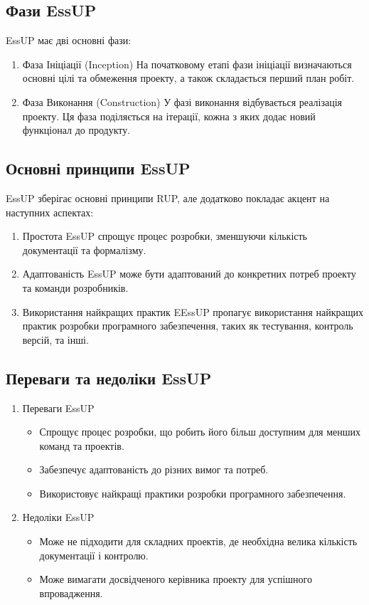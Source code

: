 \documentclass[letterpaper]{report}
\begin{document}
		\subsection{Фази EssUP}

			EssUP має дві основні фази:

			\begin{enumerate}
				\item  Фаза Ініціації (Inception)
					На початковому етапі фази ініціації визначаються основні цілі та обмеження проекту, а також складається перший план робіт.
				\item Фаза Виконання (Construction)
					У фазі виконання відбувається реалізація проекту. Ця фаза поділяється на ітерації, кожна з яких додає новий функціонал до продукту.
			\end{enumerate}

		\subsection{Основні принципи EssUP}

			EssUP зберігає основні принципи RUP, але додатково покладає акцент на наступних аспектах:

			\begin{enumerate}
				\item Простота
					EssUP спрощує процес розробки, зменшуючи кількість документації та формалізму.
				\item Адаптованість
					EssUP може бути адаптований до конкретних потреб проекту та команди розробників.
				\item Використання найкращих практик
					EEssUP пропагує використання найкращих практик розробки програмного забезпечення, таких як тестування, контроль версій, та інші.
			\end{enumerate}

		\subsection{Переваги та недоліки EssUP}

			\begin{enumerate}
				\item Переваги EssUP
					\begin{itemize}
						\item Спрощує процес розробки, що робить його більш доступним для менших команд та проектів.
						\item Забезпечує адаптованість до різних вимог та потреб.
						\item Використовує найкращі практики розробки програмного забезпечення.
					\end{itemize}
				\item Недоліки EssUP
					\begin{itemize}
						\item Може не підходити для складних проектів, де необхідна велика кількість документації і контролю.
						\item Може вимагати досвідченого керівника проекту для успішного впровадження.
					\end{itemize}
			\end{enumerate}
\end{document}

